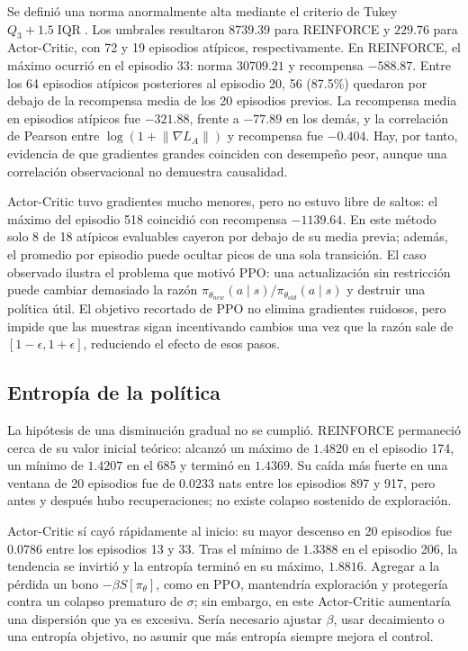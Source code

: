 \documentclass[11pt,letterpaper]{article}
\begin{document}
\begin{respuesta}
Se definió una norma anormalmente alta mediante el criterio de Tukey
$Q_3+1.5\operatorname{IQR}$. Los umbrales resultaron $8739.39$ para REINFORCE y
$229.76$ para Actor-Critic, con 72 y 19 episodios atípicos, respectivamente. En
REINFORCE, el máximo ocurrió en el episodio 33: norma $30709.21$ y recompensa
$-588.87$. Entre los 64 episodios atípicos posteriores al episodio 20, 56 (87.5\%)
quedaron por debajo de la recompensa media de los 20 episodios previos. La recompensa
media en episodios atípicos fue $-321.88$, frente a $-77.89$ en los demás, y la
correlación de Pearson entre $\log(1+\lVert\nabla L_A\rVert)$ y recompensa fue
$-0.404$. Hay, por tanto, evidencia de que gradientes grandes coinciden con desempeño
peor, aunque una correlación observacional no demuestra causalidad.

Actor-Critic tuvo gradientes mucho menores, pero no estuvo libre de saltos: el máximo
del episodio 518 coincidió con recompensa $-1139.64$. En este método solo 8 de 18
atípicos evaluables cayeron por debajo de su media previa; además, el promedio por
episodio puede ocultar picos de una sola transición. El caso observado ilustra el
problema que motivó PPO: una actualización sin restricción puede cambiar demasiado la
razón $\pi_{\theta_{new}}(a\mid s)/\pi_{\theta_{old}}(a\mid s)$ y destruir una política
útil. El objetivo recortado de PPO no elimina gradientes ruidosos, pero impide que las
muestras sigan incentivando cambios una vez que la razón sale de $[1-\epsilon,
1+\epsilon]$, reduciendo el efecto de esos pasos.
\end{respuesta}

\subsection{Entropía de la política}

\begin{respuesta}
La hipótesis de una disminución gradual no se cumplió. REINFORCE permaneció cerca de su
valor inicial teórico: alcanzó un máximo de $1.4820$ en el episodio 174, un mínimo de
$1.4207$ en el 685 y terminó en $1.4369$. Su caída más fuerte en una ventana de 20
episodios fue de $0.0233$ nats entre los episodios 897 y 917, pero antes y después hubo
recuperaciones; no existe colapso sostenido de exploración.

Actor-Critic sí cayó rápidamente al inicio: su mayor descenso en 20 episodios fue
$0.0786$ entre los episodios 13 y 33. Tras el mínimo de $1.3388$ en el episodio 206,
la tendencia se invirtió y la entropía terminó en su máximo, $1.8816$. Agregar a la
pérdida un bono $-\beta S[\pi_\theta]$, como en PPO, mantendría exploración y protegería
contra un colapso prematuro de $\sigma$; sin embargo, en este Actor-Critic aumentaría una
dispersión que ya es excesiva. Sería necesario ajustar $\beta$, usar decaimiento o una
entropía objetivo, no asumir que más entropía siempre mejora el control.
\end{respuesta}
\end{document}
